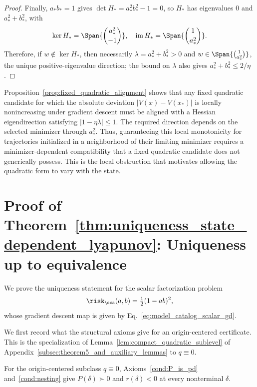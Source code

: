 \documentclass{article}
\begin{document}
\begin{proof}
Finally, $a_* b_* = 1$ gives $\det H_* = a_*^2 b_*^2 - 1 = 0$, so $H_*$ has
eigenvalues $0$ and $a_*^2+b_*^2$, with
\begin{align}
    \ker H_* = \Span{\binom{a_*^2}{-1}},
    \quad
    \operatorname{im} H_* = \Span{\binom{1}{a_*^2}}.
\end{align}
Therefore, if $w \notin \ker H_*$, then necessarily
$\lambda=a_*^2+b_*^2>0$ and
$w \in \Span{\binom{1}{a_*^2}}$, the unique positive-eigenvalue direction;
the bound on $\lambda$ also gives $a_*^2+b_*^2\le2/\eta$.
\end{proof}

Proposition~\ref{prop:fixed_quadratic_alignment} shows that any fixed quadratic
candidate for which the absolute deviation $|V(x)-V(x_*)|$ is locally
nonincreasing under gradient descent must be aligned with a Hessian
eigendirection satisfying $|1-\eta\lambda|\le1$. The required direction depends
on the selected minimizer through $a_*^2$. Thus, guaranteeing this local
monotonicity for trajectories initialized in a neighborhood of their limiting
minimizer requires a minimizer-dependent compatibility that a fixed quadratic
candidate does not generically possess. This is the local obstruction that
motivates allowing the quadratic form to vary with the state.

\section{Proof of Theorem~\ref{thm:uniqueness_state_dependent_lyapunov}:
Uniqueness up to equivalence}
\label{appendix:uniqueness_state_dependent_lyapunov}

We prove the uniqueness statement for the scalar factorization problem
\begin{align}
    \risk_\sca(a, b) = \tfrac{1}{2}(1 - ab)^2,
\end{align}
whose gradient descent map is given by Eq.~\eqref{eq:model_catalog_scalar_gd}.

We first record what the structural axioms give for an origin-centered
certificate. This is the specialization of
Lemma~\ref{lem:compact_quadratic_sublevel} of
Appendix~\ref{subsec:theorem5_and_auxiliary_lemmas} to $q\equiv0$.

\begin{corollary}\label{cor:origin_centered_pd}
For the origin-centered subclass $q\equiv 0$, Axioms~\ref{cond:P_is_pd}
and~\ref{cond:nesting} give $P(\delta)\succ 0$ and $r(\delta)<0$ at every
nonterminal $\delta$.
\end{corollary}
\end{document}
